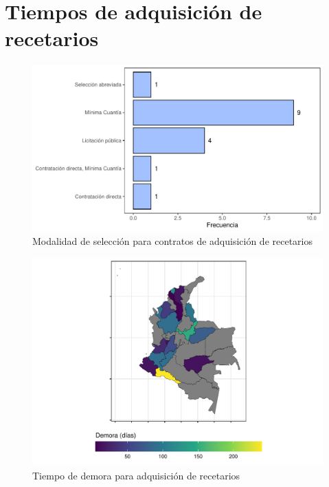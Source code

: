 \documentclass[
]{book}
\begin{document}
\hypertarget{tiempos-de-adquisiciuxf3n-de-recetarios}{%
\section{Tiempos de adquisición de recetarios}\label{tiempos-de-adquisiciuxf3n-de-recetarios}}

\begin{figure}
\includegraphics[width=0.85\linewidth]{InformeFinal_files/figure-latex/modalidadAdquisicion-1} \caption{Modalidad de selección para contratos de adquisición de recetarios}\label{fig:modalidadAdquisicion}
\end{figure}

\begin{figure}
\includegraphics[width=0.85\linewidth]{InformeFinal_files/figure-latex/tiempoDemoraAdquisicion-1} \caption{Tiempo de demora para adquisición de recetarios}\label{fig:tiempoDemoraAdquisicion}
\end{figure}
\end{document}
